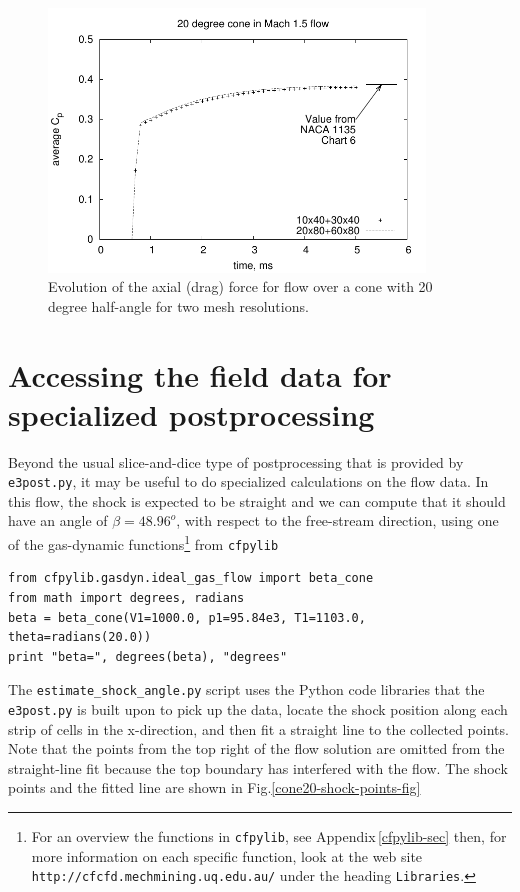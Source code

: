 \begin{figure}[htbp]
\begin{center}
\includegraphics[width=10cm]{../2D/cone20-simple/cone20_cp.pdf}
\end{center}
\caption{Evolution of the axial (drag) force
         for flow over a cone with 20 degree half-angle
	 for two mesh resolutions.}
\label{cone20-axial-force-fig}
\end{figure}

\section{Accessing the field data for specialized postprocessing}
%
Beyond the usual slice-and-dice type of postprocessing that is provided by \verb!e3post.py!, 
it may be useful to do specialized calculations on the flow data.
In this flow, the shock is expected to be straight and we can compute
that it should have an angle of $\beta = 48.96^o$, with respect to the free-stream direction,
using one of the gas-dynamic functions\footnote{For an overview the functions in \texttt{cfpylib}, 
see Appendix\,\ref{cfpylib-sec} then, for more information on each specific function,
look at the web site \texttt{http://cfcfd.mechmining.uq.edu.au/} under the heading \texttt{Libraries}.} 
from \verb!cfpylib!
\begin{verbatim}
from cfpylib.gasdyn.ideal_gas_flow import beta_cone
from math import degrees, radians
beta = beta_cone(V1=1000.0, p1=95.84e3, T1=1103.0, theta=radians(20.0))
print "beta=", degrees(beta), "degrees"
\end{verbatim}

The \texttt{estimate\_shock\_angle.py} script uses the Python code libraries 
that the \texttt{e3post.py} is built upon to pick up the data, 
locate the shock position along each strip of cells in the x-direction,
and then fit a straight line to the collected points.
Note that the points from the top right of the flow solution are omitted from the straight-line fit
because the top boundary has interfered with the flow.
The shock points and the fitted line are shown in Fig.\ref{cone20-shock-points-fig} 

